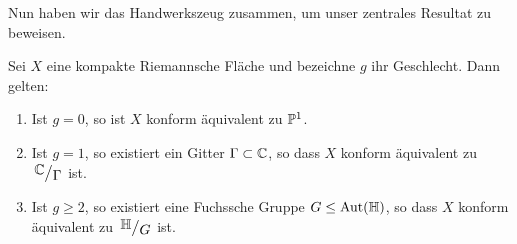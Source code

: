 Nun haben wir das Handwerkszeug zusammen, um unser zentrales Resultat
zu beweisen.

\begin{thm}
  \label{thm:uniformisierung}
  Sei $X$ eine kompakte Riemannsche Fläche und bezeichne $g$ ihr
  Geschlecht. Dann gelten:
  \begin{enumerate}
  \item Ist $g = 0$, so ist $X$ konform äquivalent zu $\P^1$.
  \item Ist $g = 1$, so existiert ein Gitter $\Gamma \subset \C$, so
    dass $X$ konform äquivalent zu $\quot{\C}{\Gamma}$ ist.
  \item Ist $g \geq 2$, so existiert eine Fuchssche Gruppe $G \leq
    \Aut(\h)$, so dass $X$ konform äquivalent zu $\quot{\h}{G}$ ist.
  \end{enumerate}
\end{thm}

